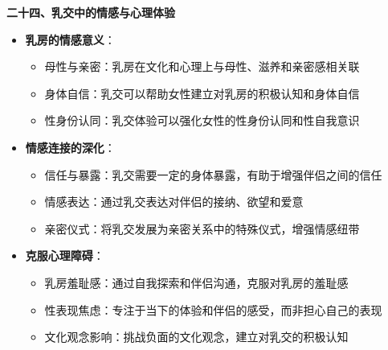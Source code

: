\documentclass[12pt,UTF8]{ctexbook}
\begin{document}
  \textbf{二十四、乳交中的情感与心理体验}
  \begin{itemize}
  \item \textbf{乳房的情感意义}：
    \begin{itemize}
    \item 母性与亲密：乳房在文化和心理上与母性、滋养和亲密感相关联
    \item 身体自信：乳交可以帮助女性建立对乳房的积极认知和身体自信
    \item 性身份认同：乳交体验可以强化女性的性身份认同和性自我意识
    \end{itemize}
  \item \textbf{情感连接的深化}：
    \begin{itemize}
    \item 信任与暴露：乳交需要一定的身体暴露，有助于增强伴侣之间的信任
    \item 情感表达：通过乳交表达对伴侣的接纳、欲望和爱意
    \item 亲密仪式：将乳交发展为亲密关系中的特殊仪式，增强情感纽带
    \end{itemize}
  \item \textbf{克服心理障碍}：
    \begin{itemize}
    \item 乳房羞耻感：通过自我探索和伴侣沟通，克服对乳房的羞耻感
    \item 性表现焦虑：专注于当下的体验和伴侣的感受，而非担心自己的表现
    \item 文化观念影响：挑战负面的文化观念，建立对乳交的积极认知
    \end{itemize}
  \end{itemize}
\end{document}
